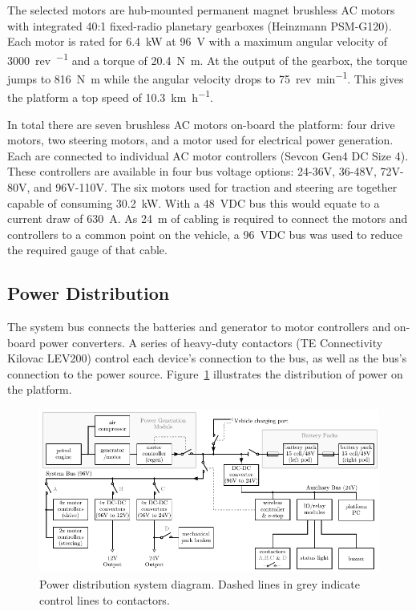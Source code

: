 \documentclass[preprint,authoryear,12pt]{elsarticle}
\begin{document}
        The selected motors are hub-mounted permanent magnet brushless AC motors with integrated 40:1 fixed-radio planetary gearboxes (Heinzmann PSM-G120).
        Each motor is rated for \SI{6.4}{\kilo\watt} at \SI{96}{\volt} with a maximum angular velocity of \SI{3000}{rev\per\min} and a torque of \SI{20.4}{\newton\meter}.
        At the output of the gearbox, the torque jumps to \SI{816}{\newton\meter} while the angular velocity drops to \SI{75}{rev\per\minute}.
        This gives the platform a top speed of \SI{10.3}{\kilo\meter\per\hour}.

        In total there are seven brushless AC motors on-board the platform: four drive motors, two steering motors, and a motor used for electrical power generation.
        Each are connected to individual AC motor controllers (Sevcon Gen4 DC Size 4).
        These controllers are available in four bus voltage options: 24-36V, 36-48V, 72V-80V, and 96V-110V.
        The six motors used for traction and steering are together capable of consuming \SI{30.2}{\kilo\watt}.
        With a \SI{48}{\volt}DC bus this would equate to a current draw of \SI{630}{\ampere}.
        As \SI{24}{\meter} of cabling is required to connect the motors and controllers to a common point on the vehicle, a \SI{96}{\volt}DC bus was used to reduce the required gauge of that cable.


    \subsection{Power Distribution}
    \label{sub:power}
        The system bus connects the batteries and generator to motor controllers and on-board power converters.
        A series of heavy-duty contactors (TE Connectivity Kilovac LEV200) control each device's connection to the bus, as well as the bus's connection to the power source.
        Figure~\ref{fig:power_system_diagram} illustrates the distribution of power on the platform.

        \begin{figure}[htb]
            \centering
            \includegraphics[width=\linewidth]{imgs/system_diagram/full-system-diagram_v1.pdf}
            \caption{Power distribution system diagram. Dashed lines in grey indicate control lines to contactors.}
            \label{fig:power_system_diagram}
        \end{figure}
\end{document}
